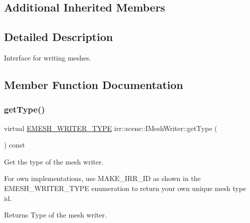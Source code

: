 \subsection*{Additional Inherited Members}


\subsection{Detailed Description}
Interface for writing meshes. 

\subsection{Member Function Documentation}
\mbox{\label{classirr_1_1scene_1_1IMeshWriter_af70d702a86e25074f96e93a2d5a15813}} 
\subsubsection{\texorpdfstring{get\+Type()}{getType()}}
{\footnotesize\ttfamily virtual \hyperlink{namespaceirr_1_1scene_a431fa15741518ba15f6d5f2608b6cb4e}{E\+M\+E\+S\+H\+\_\+\+W\+R\+I\+T\+E\+R\+\_\+\+T\+Y\+PE} irr\+::scene\+::\+I\+Mesh\+Writer\+::get\+Type (\begin{DoxyParamCaption}{ }\end{DoxyParamCaption}) const\hspace{0.3cm}{\ttfamily [pure virtual]}}



Get the type of the mesh writer. 

For own implementations, use M\+A\+K\+E\+\_\+\+I\+R\+R\+\_\+\+ID as shown in the E\+M\+E\+S\+H\+\_\+\+W\+R\+I\+T\+E\+R\+\_\+\+T\+Y\+PE enumeration to return your own unique mesh type id. \begin{DoxyReturn}{Returns}
Type of the mesh writer. 
\end{DoxyReturn}
\mbox{\label{classirr_1_1scene_1_1IMeshWriter_a8cc31e211dc94104c7dd4b0ce4fd2cca}} 

